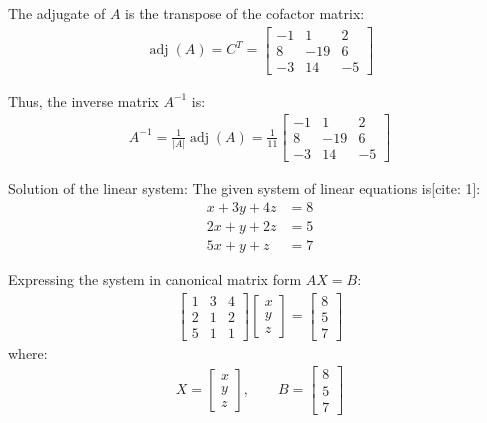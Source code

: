 \begin{enumerate}[label=\thesubsection.\arabic*, ref=\thesubsection.\theenumi]
The adjugate of $A$ is the transpose of the cofactor matrix:
\begin{align*}
	\operatorname{adj}(A) = C^T = \begin{bmatrix}
		-1 & 1 & 2 \\
		8 & -19 & 6 \\
		-3 & 14 & -5
	\end{bmatrix}
\end{align*}

Thus, the inverse matrix $A^{-1}$ is:
\begin{align*}
	A^{-1} = \frac{1}{|A|}\operatorname{adj}(A) = \frac{1}{11}\begin{bmatrix}
		-1 & 1 & 2 \\
		8 & -19 & 6 \\
		-3 & 14 & -5
	\end{bmatrix}
\end{align*}

Solution of the linear system:
The given system of linear equations is[cite: 1]:
\begin{align*}
	x + 3y + 4z &= 8 \\
	2x + y + 2z &= 5 \\
	5x + y + z &= 7
\end{align*}

Expressing the system in canonical matrix form $A X = B$:
\begin{align*}
	\begin{bmatrix}
		1 & 3 & 4 \\
		2 & 1 & 2 \\
		5 & 1 & 1
	\end{bmatrix}
	\begin{bmatrix}
		x \\
		y \\
		z
	\end{bmatrix}
	=
	\begin{bmatrix}
		8 \\
		5 \\
		7
	\end{bmatrix}
\end{align*}
where:
\begin{align*}
	X = \begin{bmatrix} x \\ y \\ z \end{bmatrix}, \qquad B = \begin{bmatrix} 8 \\ 5 \\ 7 \end{bmatrix}
\end{align*}


\end{enumerate}
